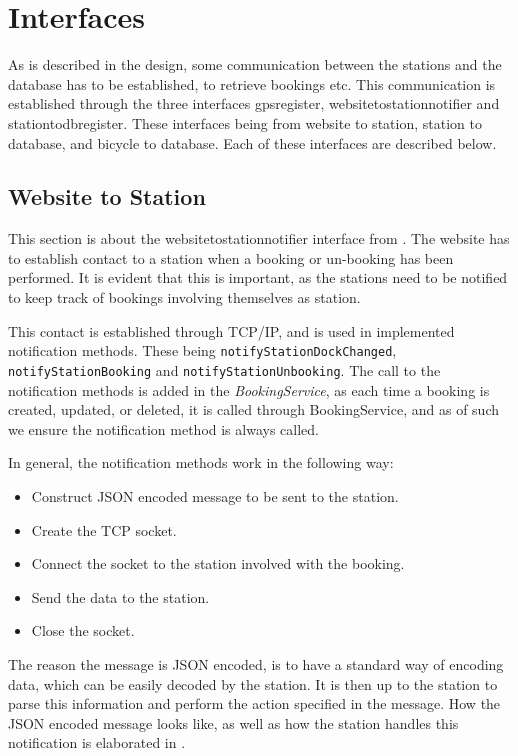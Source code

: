 \section{Interfaces}\label{sec:interfaces}
As is described in the design, some communication between the stations and the database has to be established, to retrieve bookings etc.
This communication is established through the three interfaces gpsregister, websitetostationnotifier and stationtodbregister.
These interfaces being from website to station, station to database, and bicycle to database.
Each of these interfaces are described below.

\subsection{Website to Station}\label{sec:webToStationI}
This section is about the websitetostationnotifier interface from .
The website has to establish contact to a station when a booking or un-booking has been performed.
It is evident that this is important, as the stations need to be notified to keep track of bookings involving themselves as station.

This contact is established through TCP/IP, and is used in implemented notification methods.
These being \texttt{notifyStationDockChanged}, \texttt{notifyStationBooking} and \texttt{notifyStationUnbooking}.
The call to the notification methods is added in the \textit{BookingService}, as each time a booking is created, updated, or deleted, it is called through BookingService, and as of such we ensure the notification method is always called.

In general, the notification methods work in the following way:
\begin{itemize}
	\item Construct JSON encoded message to be sent to the station.
	\item Create the TCP socket.
	\item Connect the socket to the station involved with the booking.
	\item Send the data to the station.
	\item Close the socket.
\end{itemize}

The reason the message is JSON encoded, is to have a standard way of encoding data, which can be easily decoded by the station.
It is then up to the station to parse this information and perform the action specified in the message.
How the JSON encoded message looks like, as well as how the station handles this notification is elaborated in .

